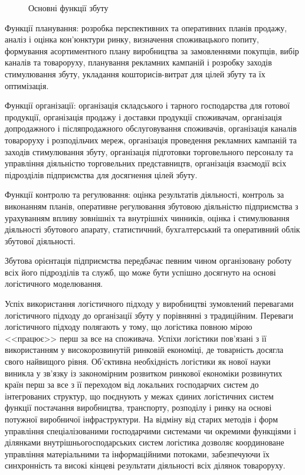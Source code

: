 \begin{figure}
	\centering
	\caption{Основні функції збуту}
	\label{fig:sales_functions}
\end{figure}

Функції планування:
розробка перспективних та оперативних планів продажу, 
аналіз і оцінка кон'юнктури ринку, 
визначення споживацького попиту, 
формування асортиментного плану виробництва за замовленнями покупців, 
вибір каналів та товароруху, 
планування рекламних кампаній і розробку заходів стимулювання збуту, 
укладання кошторисів-витрат для цілей збуту та їх оптимізація.

Функції організації:
організація складського і тарного господарства для готової продукції, 
організація продажу і доставки продукції споживачам, 
організація допродажного і післяпродажного обслуговування споживачів, 
організація каналів товароруху і розподільчих мереж, 
організація проведення рекламних кампаній та заходів стимулювання збуту, 
організація підготовки торговельного персоналу та управління діяльністю торговельних представництв, 
організація взаємодії всіх підрозділів підприємства для досягнення цілей збуту.

Функції контролю та регулювання:
оцінка результатів діяльності,
контроль за виконанням планів,
оперативне регулювання збутовою діяльністю підприємства з урахуванням впливу зовнішніх та внутрішніх чинників,
оцінка і стимулювання діяльності збутового апарату,
статистичний, бухгалтерський та оперативний облік збутової діяльності.

Збутова орієнтація підприємства передбачає певним чином організовану роботу всіх його підрозділів та служб, що може бути успішно досягнуто на основі логістичного моделювання.

Успіх використання логістичного підходу у виробництві зумовлений перевагами логістичного підходу до організації збуту у порівнянні з традиційним. 
Переваги логістичного підходу полягають у тому, що логістика повною мірою <<працює>> перш за все на споживача. 
Успіхи логістики пов’язані з її використанням у високорозвинутій ринковій економіці, де товарність досягла свого найвищого рівня. 
Об’єктивна необхідність логістики як нової науки виникла у зв’язку із закономірним розвитком ринкової економіки розвинутих країн перш за все з її переходом від локальних господарчих систем до інтегрованих структур, що поєднують у межах єдиних логістичних систем функції постачання виробництва, транспорту, розподілу і ринку на основі потужної виробничої інфраструктури. 
На відміну від старих методів і форм управління спеціалізованими господарчими системами чи окремими функціями і ділянками внутрішньогосподарських систем логістика дозволяє координоване управління матеріальними та інформаційними потоками, забезпечуючи їх синхронність та високі кінцеві результати діяльності всіх ділянок товароруху.


